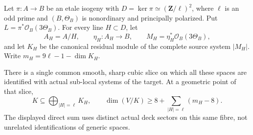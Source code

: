 \begin{theorem}
\label{thm:DE-compatible-residual-module-sum}
Let \(\pi:A\to B\) be an etale isogeny with
\(D=\ker\pi\simeq(\mathbf Z/\ell)^2\), where \(\ell\)
is an odd prime and \((B,\Theta_B)\) is nonordinary and
principally polarized. Put \(L=\pi^*\mathcal O_B(3\Theta_B)\).
For every line \(H\subset D\), let
\[
 A_H=A/H,\qquad \eta_H:A_H\to B,\qquad
 M_H=\eta_H^*\mathcal O_B(3\Theta_B),
 \tag{DE-CR3}
\]
and let \(K_H\) be the canonical residual module of the complete
source system \(|M_H|\). Write
\(m_H=9\ell-1-\dim K_H\).

There is a single common smooth, sharp cubic slice on which all
these spaces are identified with actual sub-local systems of
the target. At a geometric point of that slice,
\[
 K\subseteq\bigoplus_{|H|=\ell}K_H,
 \qquad
 \dim(V/K)\ge 8+\sum_{|H|=\ell}(m_H-8).
 \tag{DE-CR4}
\]
The displayed direct sum uses distinct actual deck sectors on
this same fibre, not unrelated identifications of generic spaces.
\end{theorem}
